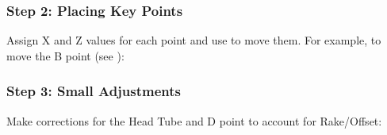 \documentclass[letterpaper,10pt,english]{jupyterBook}
\begin{document}
\begin{sphinxVerbatim}[commandchars=\\\{\}]
    
		  

  
  
    
\end{sphinxVerbatim}


\subsubsection{Step 2: Placing Key Points}
\label{\detokenize{Edit Script:step-2-placing-key-points}}
\sphinxAtStartPar
Assign X and Z values for each point and use  to move them. For example, to move the B point (see {\hyperref[\detokenize{Setting the Rig::doc}]{}}):

\begin{sphinxVerbatim}[commandchars=\\\{\}]
      
      
  
\end{sphinxVerbatim}


\subsubsection{Step 3: Small Adjustments}
\label{\detokenize{Edit Script:step-3-small-adjustments}}
\sphinxAtStartPar
Make corrections for the Head Tube and D point to account for Rake/Offset:
\end{document}

